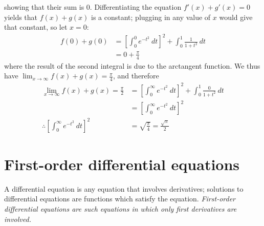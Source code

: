 \documentclass{article}
\begin{document}
showing that their sum is 0. Differentiating the equation $f'(x) + g'(x) = 0$ yields that $f(x) + g(x)$ is a constant; plugging in any value of $x$ would give that constant, so let $x = 0$:
\begin{equation*}
    \begin{aligned}
        f(0) + g(0) &= [\int_{0}^{0} e^{-t^2}\ dt]^2 + \int_{0}^{1} \frac{1}{1+t^2} \ dt \\
        &= 0 + \frac{\pi}{4}
    \end{aligned}
\end{equation*}
where the result of the second integral is due to the arctangent function. We thus have $\lim_{x \to \infty} f(x)+g(x) = \frac{\pi}{4}$, and therefore
\begin{equation*}
    \begin{aligned}
        \lim_{x \to\infty} f(x) + g(x) = \frac{\pi}{2} &= [\int_{0}^{\infty} e^{-t^2}\ dt]^2 + \int_{0}^{1} \frac{0}{1+t^2} \ dt \\
        &= [\int_{0}^{\infty} e^{-t^2}\ dt]^2 \\
        \therefore [\int_{0}^{\infty} e^{-t^2}\ dt]^2 &= \sqrt{\frac{\pi}{4}} = \frac{\sqrt{\pi}}{2}
    \end{aligned}
\end{equation*}
\section{First-order differential equations}
A differential equation is any equation that involves derivatives; solutions to differential equations are functions which satisfy the equation.
\it First-order \normalfont differential equations are such equations in which only first derivatives are involved.
\end{document}
